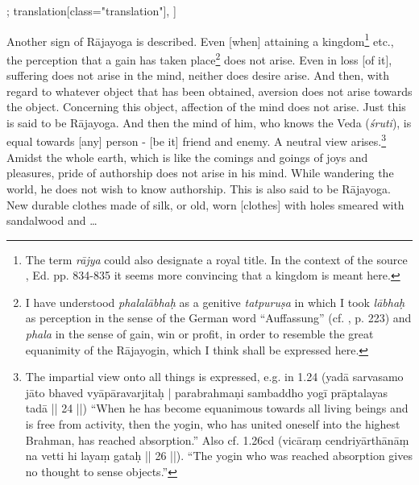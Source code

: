 \begin{alignment}[
  texts=edition[class="edition"];
  translation[class="translation"],
  ]
\begin{translation}
\begin{tlate}
   Another sign of Rājayoga is described. Even [when] attaining a kingdom\footnote{The term \textit{rājya} could also designate a royal title. In the context of the source , Ed. pp. 834-835 it seems more convincing that a kingdom is meant here.} etc., the perception that a gain has taken place\footnote{I have understood \textit{phalalābhaḥ} as a genitive \textit{tatpuruṣa} in which I took \textit{lābhaḥ} as perception in the sense of the German word ``Auffassung'' (cf. , p. 223) and \textit{phala} in the sense of gain, win or profit, in order to resemble the great equanimity of the Rājayogin, which I think shall be expressed here.} does not arise. Even in loss [of it], suffering does not arise in the mind, neither does desire arise. And then, with regard to whatever object that has been obtained, aversion does not arise towards the object.\textsuperscript{\coro{[\lowroman{5}]}} Concerning this object, affection of the mind does not arise. Just this is said to be Rājayoga. And then the mind of him, who knows the Veda (\textit{śruti}), is equal towards [any] person - [be it] friend and enemy. A neutral view arises.\footnote{The impartial view onto all things is expressed, e.g. in  1.24 (yadā sarvasamo jāto bhaved vyāpāravarjitaḥ | parabrahmaṇi sambaddho yogī prāptalayas tadā || 24 ||) ``When he has become equanimous towards all living beings and is free from activity, then the yogin, who has united oneself into the highest Brahman, has reached absorption.'' Also cf.  1.26cd (vicāraṃ cendriyārthānāṃ na vetti hi layaṃ gataḥ || 26 ||). ``The yogin who was reached absorption gives no thought to sense objects.''}
Amidst the whole earth, which is like the comings and goings of joys and pleasures, pride of authorship does not arise in his mind.\textsuperscript{\coro{[\lowroman{10}]}} While wandering the world, he does not wish to know authorship. This is also said to be Rājayoga. New durable clothes made of silk, or old, worn [clothes] with holes smeared with sandalwood and \ldots 
 \end{tlate}
\end{translation}
\end{alignment}
\ekdpb*{}
